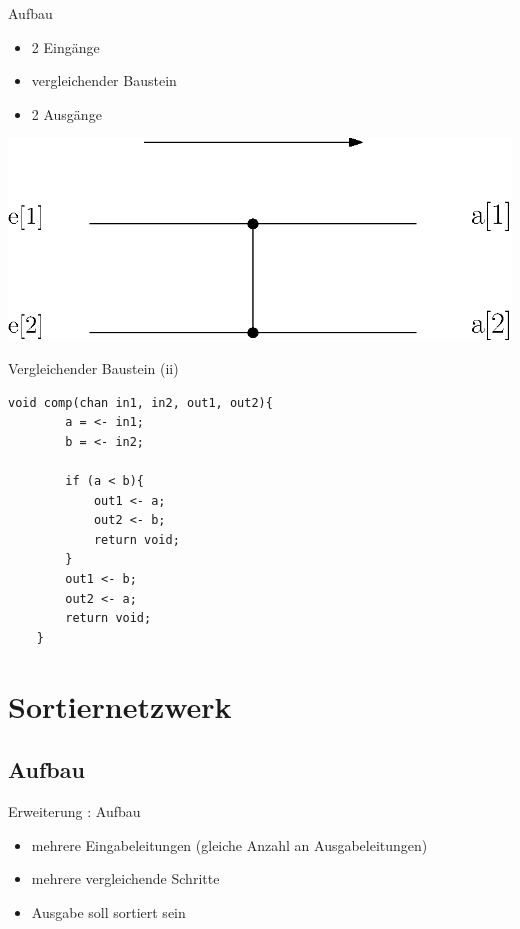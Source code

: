 \documentclass[ucs,9pt]{beamer}
\begin{document}
\begin{frame}{Aufbau}
    \begin{minipage}[c]{14.5cm}
    		\begin{minipage}[c]{5cm}
        		\begin{itemize}
            		\item 2 Eingänge
	            	\item vergleichender Baustein
    		        	\item 2 Ausgänge
        		\end{itemize}
	    \end{minipage}
		\begin{minipage}[c]{5cm}
			\includegraphics[scale=0.5]{Komparator1.eps}
	 	\end{minipage}
    \end{minipage}
\end{frame}

\begin{frame}[fragile]{Vergleichender Baustein (ii)}
\begin{lstlisting}[laguage={inform},tabsize=4]
    void comp(chan in1, in2, out1, out2){
        a = <- in1;
        b = <- in2;
        
        if (a < b){
            out1 <- a;
            out2 <- b;
            return void;
        }
        out1 <- b;
        out2 <- a;
        return void;
    }
\end{lstlisting}
\end{frame}

\section{Sortiernetzwerk}
\subsection{Aufbau}

\begin{frame}{Erweiterung : Aufbau}
    \begin{itemize}
        \item mehrere Eingabeleitungen (gleiche Anzahl an Ausgabeleitungen)
        \item mehrere vergleichende Schritte
        \item Ausgabe soll sortiert sein
    \end{itemize}
\end{frame}
\end{document}
